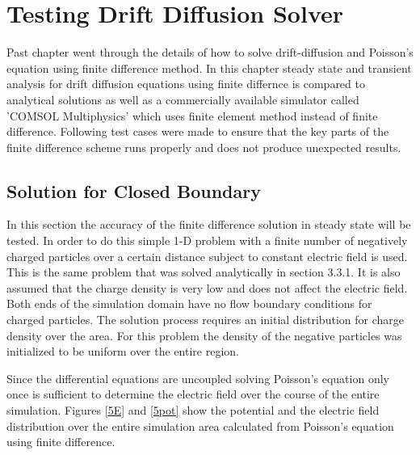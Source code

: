 
\chapter{Testing Drift Diffusion Solver} %

\label{Chapter4} %


\begin{doublespace}

Past chapter went through the details of how to solve drift-diffusion and Poisson's equation using finite difference method. In this chapter steady state and transient analysis for drift diffusion equations using finite differnce is compared to analytical solutions as well as a commercially available simulator called 'COMSOL Multiphysics' which uses finite element method instead of finite difference. Following test cases were made to ensure that the key parts of the finite difference scheme runs properly and does not produce unexpected results. 

\section{Solution for Closed Boundary}
In this section the accuracy of the finite difference solution in steady state will be tested. In order to do this simple 1-D problem with a finite number of negatively charged particles over a certain distance subject to constant electric field is used. This is the same problem that was solved analytically in section 3.3.1. It is also assumed that the charge density is very low and does not affect the electric field. Both ends of the simulation domain have no flow boundary conditions for charged particles. The solution process requires an initial distribution for charge density over the area. For this problem the density of the negative particles was initialized to be uniform over the entire region. 

Since the differential equations are uncoupled solving Poisson's equation only once is sufficient to determine the electric field over the course of the entire simulation. Figures \ref{5E} and \ref{5pot} show the potential and the electric field distribution over the entire simulation area calculated from Poisson's equation using finite difference. 


\end{doublespace}
